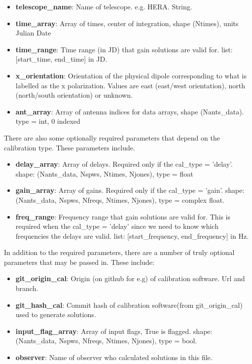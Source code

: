 \documentclass[11pt, oneside]{article}   	%
\begin{document}
\begin{itemize}
	\item{\textbf{telescope\_name}: Name of telescope. e.g. HERA. String.}
	\item{\textbf{time\_array}: Array of times, center of integration, shape (Ntimes), units Julian Date}
	\item{\textbf{time\_range}: Time range (in JD) that gain solutions are valid for. list: [start\_time, end\_time] in JD.}
	\item{\textbf{x\_orientation}: Orientation of the physical dipole corresponding to what is labelled as the x polarization. Values are east (east/west orientation), north (north/south orientation) or unknown.}
	\item{\textbf{ant\_array}:  Array of antenna indices for data arrays, shape (Nants\_data). type = int, 0 indexed}
\end{itemize}

There are also some optionally required parameters that depend on the calibration type. These parameters include. 
\begin{itemize}
	\item{\textbf{delay\_array}: Array of delays. Required only if the cal\_type = 'delay'. shape: (Nants\_data, Nspws, Ntimes, Njones), type = float}
	\item{\textbf{gain\_array}: Array of gains. Required only if the cal\_type = 'gain'.  shape: (Nants\_data, Nspws, Nfreqs, Ntimes, Njones), type = complex float.}
	\item{\textbf{freq\_range}: Frequency range that gain solutions are valid for. This is required when the cal\_type = 'delay' since we need to know which frequencies the delays are valid. list: [start\_frequency, end\_frequency] in Hz.}
\end{itemize}

In addition to the required parameters, there are a number of truly optional parameters that may be passed in. These include: 

\begin{itemize}
	\item{\textbf{git\_origin\_cal}: Origin (on github for e.g) of calibration software. Url and branch.}
	\item{\textbf{git\_hash\_cal}: Commit hash of calibration software(from git\_origin\_cal) used to generate solutions.}
	\item{\textbf{input\_flag\_array}: Array of input flags, True is flagged. shape: (Nants\_data, Nspws, Nfreqs, Ntimes, Njones), type = bool.}
	\item{\textbf{observer}: Name of observer who calculated solutions in this file.}
\end{itemize}
\end{document}
